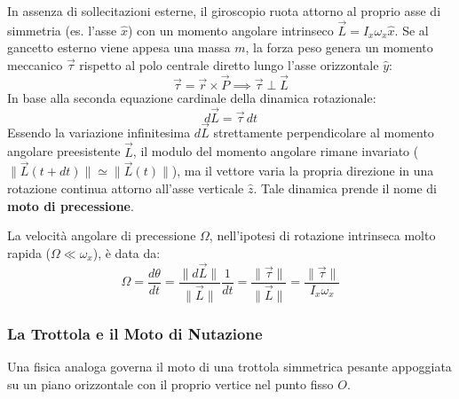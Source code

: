 In assenza di sollecitazioni esterne, il giroscopio ruota attorno al proprio asse di simmetria (es. l'asse $\hat{x}$) con un momento angolare intrinseco $\vec{L} = I_x \omega_x \hat{x}$. Se al gancetto esterno viene appesa una massa $m$, la forza peso genera un momento meccanico $\vec{\tau}$ rispetto al polo centrale diretto lungo l'asse orizzontale $\hat{y}$:
\begin{equation}
    \vec{\tau} = \vec{r} \times \vec{P} \implies \vec{\tau} \perp \vec{L}
\end{equation}
In base alla seconda equazione cardinale della dinamica rotazionale:
\begin{equation}
    d\vec{L} = \vec{\tau} \, dt
\end{equation}
Essendo la variazione infinitesima $d\vec{L}$ strettamente perpendicolare al momento angolare preesistente $\vec{L}$, il modulo del momento angolare rimane invariato ($\|\vec{L}(t+dt)\| \simeq \|\vec{L}(t)\|$), ma il vettore varia la propria direzione in una rotazione continua attorno all'asse verticale $\hat{z}$. Tale dinamica prende il nome di \textbf{moto di precessione}.

La velocità angolare di precessione $\Omega$, nell'ipotesi di rotazione intrinseca molto rapida ($\Omega \ll \omega_x$), è data da:
\begin{equation}
    \Omega = \frac{d\theta}{dt} = \frac{\|d\vec{L}\|}{\|\vec{L}\|} \frac{1}{dt} = \frac{\|\vec{\tau}\|}{\|\vec{L}\|} = \frac{\|\vec{\tau}\|}{I_x \omega_x}
\end{equation}

\subsubsection{La Trottola e il Moto di Nutazione}
Una fisica analoga governa il moto di una trottola simmetrica pesante appoggiata su un piano orizzontale con il proprio vertice nel punto fisso $O$.

